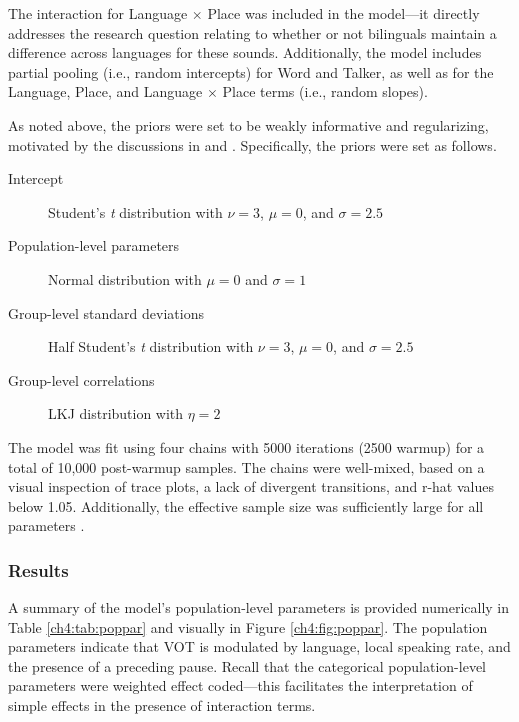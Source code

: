 The interaction for Language $\times$ Place was included in the model---it directly addresses the research question relating to whether or not bilinguals maintain a difference across languages for these sounds. Additionally, the model includes partial pooling (i.e., random intercepts) for Word and Talker, as well as for the Language, Place, and Language $\times$ Place terms (i.e., random slopes). 

As noted above, the priors were set to be weakly informative and regularizing, motivated by the discussions in \citet{gelman_2017_prior} and \citet{mcelreath_2020_sr}. Specifically, the priors were set as follows.

\begin{description}
	\item[Intercept] Student's \textit{t} distribution with $\nu = 3$, $\mu = 0$, and $\sigma = 2.5$
	\item[Population-level parameters] Normal distribution with $\mu = 0$ and $\sigma = 1$
	\item[Group-level standard deviations] Half Student's \textit{t} distribution with $\nu = 3$, $\mu = 0$, and $\sigma = 2.5$
	\item[Group-level correlations] LKJ distribution with $\eta=2$
\end{description}

The model was fit using four chains with 5000 iterations (2500 warmup) for a total of 10,000 post-warmup samples. The chains were well-mixed, based on a visual inspection of trace plots, a lack of divergent transitions, and r-hat values below 1.05. Additionally, the effective sample size was sufficiently large for all parameters \citep[for discussion, see][]{vasishth_2018_bayesian}.

\subsubsection{Results}

A summary of the model's population-level parameters is provided numerically in Table \ref{ch4:tab:poppar} and visually in Figure \ref{ch4:fig:poppar}. The population parameters indicate that VOT is modulated by language, local speaking rate, and the presence of a preceding pause. Recall that the categorical population-level parameters were weighted effect coded---this facilitates the interpretation of simple effects in the presence of interaction terms.

